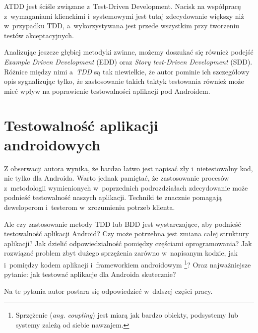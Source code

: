 ATDD jest ściśle związane z~Test-Driven Development. Nacisk na współpracę z~wymaganiami klienckimi i~systemowymi jest tutaj zdecydowanie większy niż w~przypadku TDD, a~wykorzystywana jest przede wszystkim przy tworzeniu testów akceptacyjnych.

Analizując jeszcze głębiej metodyki zwinne, możemy doszukać się również podejść \textit{Example Driven Development} (EDD) oraz \textit{Story test-Driven Development} (SDD). Różnice między nimi a~\textit{TDD} są tak niewielkie, że autor pominie ich szczegółowy opis sygnalizując tylko, że zastosowanie takich taktyk testowania również może mieć wpływ na poprawienie testowalności aplikacji pod Androidem.  

\section{Testowalność aplikacji androidowych}
Z obserwacji autora wynika, że bardzo łatwo jest napisać zły i~nietestowalny kod, nie tylko dla Androida. Warto jednak pamiętać, że zastosowanie procesów z~metodologii wymienionych w~poprzednich podrozdziałach zdecydowanie może podnieść testowalność naszych aplikacji. Techniki te znacznie pomagają deweloperom i~testerom w~zrozumieniu potrzeb klienta.

Ale czy zastosowanie metody TDD lub BDD jest wystarczające, aby podnieść testowalność aplikacji Android? Czy może potrzebna jest zmiana całej struktury aplikacji? Jak dzielić odpowiedzialność pomiędzy częściami oprogramowania? Jak rozwiązać problem zbyt dużego sprzężenia zarówno w~napisanym kodzie, jak i~pomiędzy kodem aplikacji i~frameworkiem androidowym \footnote{Sprzężenie (\textit{ang. coupling}) jest miarą jak bardzo obiekty, podsystemy lub systemy zależą od siebie nawzajem.}? Oraz najważniejsze pytanie: jak testować aplikacje dla Androida skutecznie?

Na te pytania autor postara się odpowiedzieć w~dalszej części pracy.



